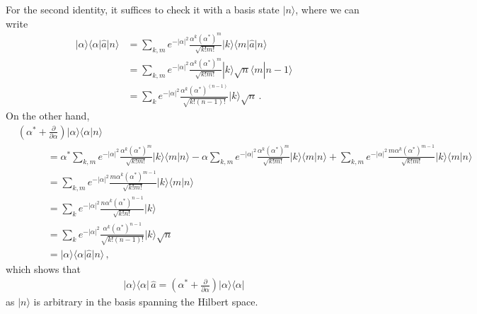 \documentclass[11pt, oneside]{book}
\theoremstyle{break}
\theoremstyle{break}
\newcommand{\pd}{\partial}
\begin{document}
For the second identity, it suffices to check it with a basis state $|n\rangle$, where we can write
\begin{align*}
|\alpha\rangle \langle \alpha | \hat{a} |n\rangle &=
\sum_{k,m}e^{-|\alpha|^2}\frac{\alpha^k (\alpha^*)^{m}}{\sqrt{k!m!}} |k\rangle \langle m| \hat{a}|n\rangle \\
&= \sum_{k,m}e^{-|\alpha|^2}\frac{\alpha^k (\alpha^*)^{m}}{\sqrt{k!m!}} |k\rangle \sqrt{n} \langle m|n-1\rangle\\
&= \sum_{k}e^{-|\alpha|^2}\frac{\alpha^k (\alpha^*)^{(n-1)}}{\sqrt{k!(n-1)!}} |k\rangle \sqrt{n} \,. 
\end{align*}
On the other hand, 
\begin{align*}
&\left( \alpha^* + \frac{\pd}{\pd \alpha}\right)
|\alpha \rangle \langle \alpha | n\rangle\\
&{}\qquad\quad =
\alpha^* \sum_{k,m}e^{-|\alpha|^2}\frac{\alpha^k (\alpha^*)^{m}}{\sqrt{k!m!}} |k\rangle \langle m|n\rangle
- \alpha \sum_{k,m}e^{-|\alpha|^2}\frac{\alpha^k (\alpha^*)^{m}}{\sqrt{k!m!}} |k\rangle \langle m|n\rangle
+ \sum_{k,m}e^{-|\alpha|^2}\frac{m\alpha^{k} (\alpha^*)^{m-1}}{\sqrt{k!m!}} |k\rangle \langle m|n\rangle\\
&{}\qquad\quad =
\sum_{k,m}e^{-|\alpha|^2}\frac{m\alpha^{k} (\alpha^*)^{m-1}}{\sqrt{k!m!}} |k\rangle \langle m|n\rangle\\
&{}\qquad\quad =
\sum_{k}e^{-|\alpha|^2}\frac{n\alpha^{k} (\alpha^*)^{n-1}}{\sqrt{k!n!}} |k\rangle \\
&{}\qquad\quad =
\sum_{k}e^{-|\alpha|^2}\frac{\alpha^{k} (\alpha^*)^{n-1}}{\sqrt{k!(n-1)!}} |k\rangle \sqrt{n} \\
&{}\qquad\quad =
|\alpha\rangle \langle \alpha | \hat{a} |n\rangle\,,
\end{align*}
which shows that 
\begin{align*}
|\alpha\rangle \langle \alpha | \,\hat{a}  = 
\left( \alpha^* + \frac{\pd}{\pd \alpha}\right)
|\alpha \rangle \langle \alpha |
\end{align*}
as $|n\rangle$ is arbitrary in the basis spanning the Hilbert space. 
\end{document}

